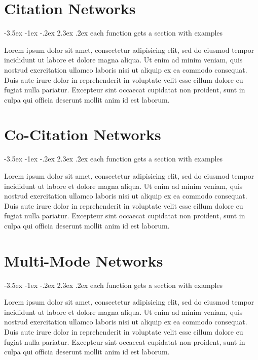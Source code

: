 \documentclass[12pt,usenames,dvipsnames,article,oneside]{memoir}
\makeatletter
\renewcommand\section{\@startsection{section}{1}{\z@}%
                                  {-3.5ex \@plus -1ex \@minus -.2ex}%
                                  {2.3ex \@plus.2ex}%
                                  {\normalfont\large\bfseries}} %
\makeatother
\begin{document}
\chapter{Citation Networks}

\section{each function gets a section with examples}

Lorem ipsum dolor sit amet, consectetur adipisicing elit, sed do eiusmod tempor incididunt ut labore et dolore magna aliqua. Ut enim ad minim veniam, quis nostrud exercitation ullamco laboris nisi ut aliquip ex ea commodo consequat. Duis aute irure dolor in reprehenderit in voluptate velit esse cillum dolore eu fugiat nulla pariatur. Excepteur sint occaecat cupidatat non proident, sunt in culpa qui officia deserunt mollit anim id est laborum.

\chapter{Co-Citation Networks}

\section{each function gets a section with examples}

Lorem ipsum dolor sit amet, consectetur adipisicing elit, sed do eiusmod tempor incididunt ut labore et dolore magna aliqua. Ut enim ad minim veniam, quis nostrud exercitation ullamco laboris nisi ut aliquip ex ea commodo consequat. Duis aute irure dolor in reprehenderit in voluptate velit esse cillum dolore eu fugiat nulla pariatur. Excepteur sint occaecat cupidatat non proident, sunt in culpa qui officia deserunt mollit anim id est laborum.

\chapter{Multi-Mode Networks}

\section{each function gets a section with examples}

Lorem ipsum dolor sit amet, consectetur adipisicing elit, sed do eiusmod tempor incididunt ut labore et dolore magna aliqua. Ut enim ad minim veniam, quis nostrud exercitation ullamco laboris nisi ut aliquip ex ea commodo consequat. Duis aute irure dolor in reprehenderit in voluptate velit esse cillum dolore eu fugiat nulla pariatur. Excepteur sint occaecat cupidatat non proident, sunt in culpa qui officia deserunt mollit anim id est laborum.
\end{document}
